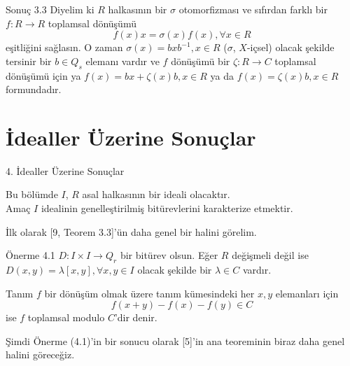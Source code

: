 \documentclass{beamer}
\begin{document}
\begin{frame}

\begin{block}{Sonuç 3.3}
Diyelim ki $R$ halkasının bir $\sigma$ otomorfizması ve sıfırdan farklı bir $f \colon R \to R$ toplamsal dönüşümü
\begin{equation*}
    f(x)x = \sigma(x)f(x), \forall x \in R
\end{equation*}
eşitliğini sağlasın. O zaman $\sigma(x) = bxb^{-1}, x \in R$ ($\sigma$, $X$-içsel) olacak şekilde tersinir bir $b \in Q_s$ elemanı vardır ve $f$ dönüşümü bir $\zeta: R \to C$ toplamsal dönüşümü için ya $f(x) = bx + \zeta(x)b, x \in R$ ya da $f(x) = \zeta(x)b, x \in R$ formundadır.
\end{block}
    
\end{frame}

\section{İdealler Üzerine Sonuçlar}

\begin{frame}{4. İdealler Üzerine Sonuçlar}
    
Bu bölümde $I$, $R$ asal halkasının bir ideali olacaktır.\\
Amaç $I$ idealinin genelleştirilmiş bitürevlerini karakterize etmektir.
    
\end{frame}

\begin{frame}

İlk olarak [9, Teorem 3.3]'ün daha genel bir halini görelim.

\begin{block}{Önerme 4.1}
$D \colon I \times I \to Q_r$ bir bitürev olsun. Eğer $R$ değişmeli değil ise $D(x,y) = \lambda[x,y], \forall x,y \in I$ olacak şekilde bir $\lambda \in C$ vardır.
\end{block}
    
\end{frame}

\begin{frame}

\begin{block}{Tanım}
$f$ bir dönüşüm olmak üzere tanım kümesindeki her $x, y$ elemanları için
\begin{equation*}
    f(x+y) - f(x) - f(y) \in C
\end{equation*}
ise $f$ toplamsal modulo $C$'dir denir.
\end{block}

Şimdi Önerme (4.1)'in bir sonucu olarak [5]'in ana teoreminin biraz daha genel halini göreceğiz.
    
\end{frame}
\end{document}
